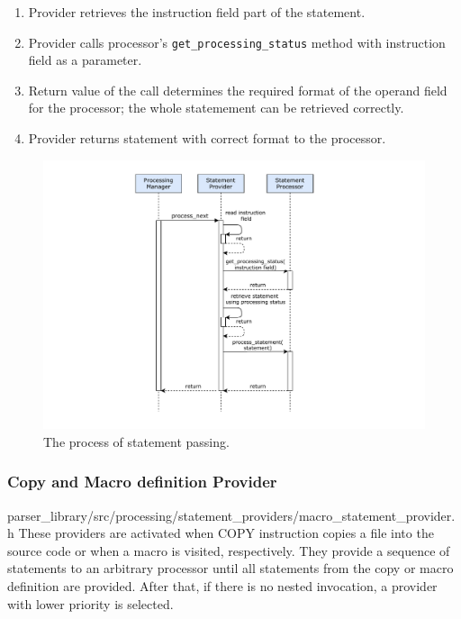 \begin{enumerate}
	\item Provider retrieves the instruction field part of the statement.
	\item Provider calls processor's \texttt{get\_processing\_status} method with instruction field as a parameter.
	\item Return value of the call determines the required format of the operand field for the processor; the whole statemement can be retrieved correctly.
	\item Provider returns statement with correct format to the processor. 
\end{enumerate}

\begin{figure}
	\centering
	\includegraphics[width=13cm]{img/process_next}
	\caption{The process of statement passing.}
	\label{fig06:process_next}
\end{figure}


\subsubsection{Copy and Macro definition Provider}
{parser\_library/src/processing/statement\_providers/macro\_statement\_provider.h}
These providers are activated when COPY instruction copies a file into the source code or when a macro is visited, respectively. They provide a sequence of statements to an arbitrary processor until all statements from the copy or macro definition are provided. After that, if there is no nested invocation, a provider with lower priority is selected.

